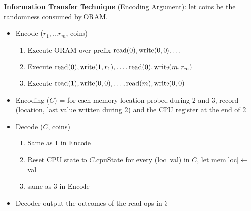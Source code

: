 \textbf{Information Transfer Technique} (Encoding Argument): let coins be the randomness consumed by ORAM.
\begin{itemize}
  \item Encode ($r_1, \dots r_m$, coins)
  \begin{enumerate}
    \item Execute ORAM over prefix $\mbox{read}(0), \mbox{write}(0, 0), \dots$
    \item Execute $\mbox{read}(0), \mbox{write}(1, r_1), \dots, \mbox{read}(0), \mbox{write}(m, r_m)$
    \item Execute $\mbox{read}(1), \mbox{write}(0, 0), \dots, \mbox{read}(m), \mbox{write}(0, 0)$
  \end{enumerate}
  \item Encoding ($C$) = for each memory location probed during 2 and 3, record (location, last value written during 2) and the CPU register at the end of 2
  \item Decode ($C$, coins)
  \begin{enumerate}
    \item Same as 1 in Encode
    \item Reset CPU state to $C$.cpuState for every (loc, val) in $C$, let mem[loc]$\leftarrow$ val
    \item same as 3 in Encode
  \end{enumerate}
  \item Decoder output the outcomes of the read ops in 3
\end{itemize}

